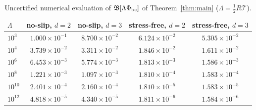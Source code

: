 \begin{table}[t]\centering
\caption{Uncertified numerical evaluation of $\mathfrak B[\Lambda\Phi_{\rm bc}]$ of Theorem~\ref{thm:main} ($\Lambda=\frac12R\mathcal T$).}\label{tab:bound}
\begin{tabular}{lcccc}\hline
$\Lambda$ & no-slip, $d=2$ & no-slip, $d=3$ & stress-free, $d=2$ & stress-free, $d=3$\\\hline
$10^{3}$ & $1.000\times10^{-1}$ & $8.700\times10^{-2}$ & $6.124\times10^{-2}$ & $5.305\times10^{-2}$ \\
$10^{4}$ & $3.739\times10^{-2}$ & $3.311\times10^{-2}$ & $1.846\times10^{-2}$ & $1.611\times10^{-2}$ \\
$10^{6}$ & $6.453\times10^{-3}$ & $5.774\times10^{-3}$ & $1.813\times10^{-3}$ & $1.586\times10^{-3}$ \\
$10^{8}$ & $1.221\times10^{-3}$ & $1.097\times10^{-3}$ & $1.810\times10^{-4}$ & $1.583\times10^{-4}$ \\
$10^{10}$ & $2.401\times10^{-4}$ & $2.160\times10^{-4}$ & $1.810\times10^{-5}$ & $1.583\times10^{-5}$ \\
$10^{12}$ & $4.818\times10^{-5}$ & $4.340\times10^{-5}$ & $1.811\times10^{-6}$ & $1.584\times10^{-6}$ \\
\hline\end{tabular}\end{table}
